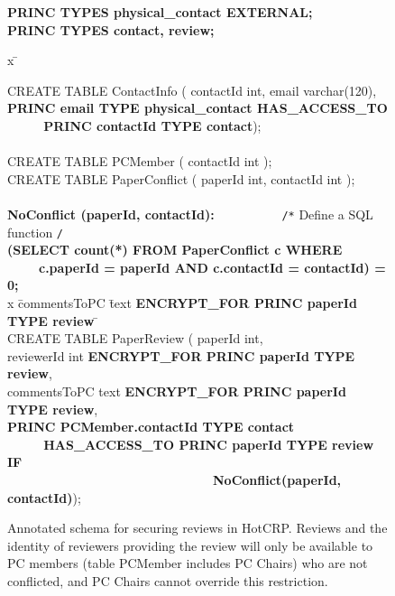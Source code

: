 \begin{figure}
\renewcommand{\FrameSep}{0.05in}
\begin{framed}
\footnotesize

{\bf PRINC TYPES physical\_contact EXTERNAL;} \\
{\bf PRINC TYPES contact, review;}

\begin{tabbing}

x \= \kill


CREATE TABLE ContactInfo ( contactId int, email varchar(120), \\
\> {\bf PRINC email TYPE physical\_contact HAS\_ACCESS\_TO } \\
\> {\bf ~ ~ ~ PRINC contactId TYPE contact});\\

\\

CREATE TABLE PCMember ( contactId int ); \\

CREATE TABLE PaperConflict ( paperId int, contactId int );\\
\\

{\bf NoConflict (paperId, contactId):} ~ ~ ~ ~ ~ ~ {\tt /*} Define a SQL function {\tt */} \\
\> {\bf (SELECT count(*) FROM PaperConflict c  WHERE }\\
\> {~ ~ ~ \bf c.paperId = paperId AND c.contactId = contactId) = 0;} \\

x \= commentsToPC \= text \= {\bf ENCRYPT\_FOR PRINC paperId TYPE review} \= \kill
\\
CREATE TABLE PaperReview ( paperId int, \\
\> reviewerId \> int \> {\bf ENCRYPT\_FOR PRINC paperId TYPE review}, \\
\> commentsToPC \>text \> {\bf ENCRYPT\_FOR PRINC paperId TYPE review},\\


\> {\bf PRINC PCMember.contactId TYPE contact }\\
\> {\bf ~ ~ ~ HAS\_ACCESS\_TO PRINC paperId TYPE review IF } \\
\> {\bf ~ ~  ~ ~ ~ ~ ~ ~ ~ ~ ~ ~ ~ ~ ~ ~ ~ NoConflict(paperId, contactId)});

\end{tabbing}
\vspace{-0.15in}
\end{framed}
\vspace{-0.2in}
\caption{Annotated schema for securing reviews in HotCRP\@. Reviews and
the identity of reviewers providing the review will only be available to
PC members (table PCMember includes PC Chairs) who are not conflicted,
and PC Chairs cannot override this restriction.}

\label{fig:hotcrp}
\end{figure}




